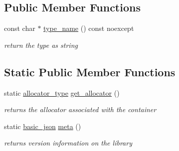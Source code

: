 \subsection*{Public Member Functions}
\begin{DoxyCompactItemize}
\item 
const char $\ast$ \hyperlink{classnlohmann_1_1basic__json_a9d0a478571f82f0163b96b2424cd998f}{type\+\_\+name} () const noexcept
\begin{DoxyCompactList}\small\item\em return the type as string \end{DoxyCompactList}\end{DoxyCompactItemize}
\subsection*{Static Public Member Functions}
\begin{DoxyCompactItemize}
\item 
static \hyperlink{classnlohmann_1_1basic__json_a86ce930490cf7773b26f5ef49c04a350}{allocator\+\_\+type} \hyperlink{classnlohmann_1_1basic__json_af4ac14224fbdd29d3547fcb11bb55c8f}{get\+\_\+allocator} ()
\begin{DoxyCompactList}\small\item\em returns the allocator associated with the container \end{DoxyCompactList}\item 
static \hyperlink{classnlohmann_1_1basic__json}{basic\+\_\+json} \hyperlink{classnlohmann_1_1basic__json_aef6d0eeccee7c5c7e1317c2ea1607fab}{meta} ()
\begin{DoxyCompactList}\small\item\em returns version information on the library \end{DoxyCompactList}\end{DoxyCompactItemize}
